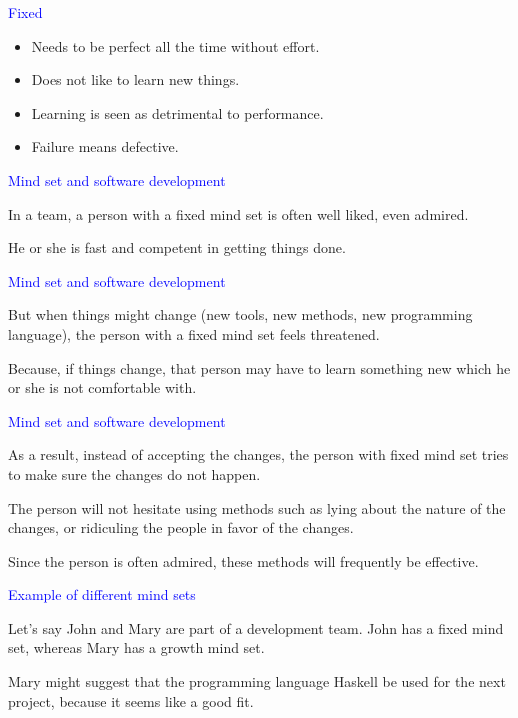 \documentclass{slides}
\newcommand{\ti}[1]{\begin{center}\Large{\textcolor{blue}{#1}}\end{center}}
\begin{document}
\begin{slide}\ti{Fixed}

  \begin{itemize}
  \item Needs to be perfect all the time without effort.
  \item Does not like to learn new things.
  \item Learning is seen as detrimental to performance.
  \item Failure means defective.
  \end{itemize}

\vfill\end{slide}
\begin{slide}\ti{Mind set and software development}

In a team, a person with a fixed mind set is often well liked,
even admired.

He or she is fast and competent in getting things done.

\vfill\end{slide}
\begin{slide}\ti{Mind set and software development}

But when things might change (new tools, new methods, new programming
language), the person with a fixed mind set feels threatened.

Because, if things change, that person may have to learn something new
which he or she is not comfortable with.

\vfill\end{slide}
\begin{slide}\ti{Mind set and software development}

As a result, instead of accepting the changes, the person with fixed
mind set tries to make sure the changes do not happen.

The person will not hesitate using methods such as lying about the
nature of the changes, or ridiculing the people in favor of the
changes.

Since the person is often admired, these methods will frequently be
effective.

\vfill\end{slide}
\begin{slide}\ti{Example of different mind sets}

Let's say John and Mary are part of a development team.  John has a
fixed mind set, whereas Mary has a growth mind set.

Mary might suggest that the programming language Haskell be used for
the next project, because it seems like a good fit.

\vfill\end{slide}
\end{document}

